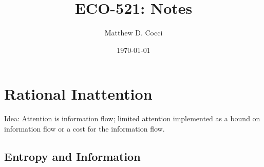 \documentclass[12pt]{article}
\author{Matthew D. Cocci}
\title{ECO-521: Notes}
\date{\today}
\theoremstyle{plain}
\theoremstyle{definition}
\theoremstyle{remark}
\begin{document}
\maketitle
\tableofcontents

\clearpage
\section{Rational Inattention}

Idea: Attention is information flow; limited attention implemented as a
bound on information flow or a cost for the information flow.

\subsection{Entropy and Information}
\end{document}
